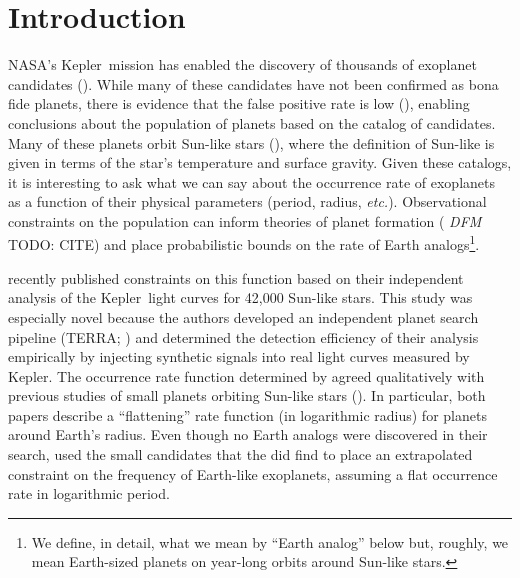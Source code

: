 \documentclass[12pt,preprint]{aastex}
\newcommand{\project}[1]{{\sffamily #1}}
\newcommand{\kepler}{\project{Kepler}}
\newcommand{\terra}{\project{TERRA}}
\newcommand{\foreign}[1]{\emph{#1}}
\newcommand{\etc}{\foreign{etc.}}
\newcommand{\todo}[3]{{\color{#2} \emph{#1} TODO: #3}}
\newcommand{\dfmtodo}[1]{\todo{DFM}{red}{#1}}
\begin{document}

\section{Introduction}

NASA's \kepler\ mission has enabled the discovery of thousands of exoplanet
candidates (\citealt{kepler-catalog}).
While many of these candidates have not been confirmed as bona fide planets,
there is evidence that the false positive rate is low (\citealt{morton,
fressin-fp}), enabling conclusions about the population of planets based on
the catalog of candidates.
Many of these planets orbit Sun-like stars (\citealt{petigura}), where the
definition of Sun-like is given in terms of the star's temperature and surface
gravity.
Given these catalogs, it is interesting to ask what we can say about the
occurrence rate of exoplanets as a function of their physical parameters
(period, radius, \etc).
Observational constraints on the population can inform theories
of planet formation (\dfmtodo{CITE}) and place probabilistic bounds on the
rate of Earth analogs\footnote{We define, in detail, what we mean by ``Earth
analog'' below but, roughly, we mean Earth-sized planets on year-long orbits
around Sun-like stars.}.

\citet{petigura} recently published constraints on this function based on
their independent analysis of the \kepler\ light curves for 42,000 Sun-like
stars.
This study was especially novel because the authors developed an independent
planet search pipeline (\terra; \citealt{petigura-a}) and determined the
detection efficiency of their analysis empirically by injecting synthetic
signals into real light curves measured by \kepler.
The occurrence rate function determined by \citet{petigura} agreed
qualitatively with previous studies of small planets orbiting Sun-like stars
(\citealt{dong}).
In particular, both papers describe a ``flattening'' rate function (in
logarithmic radius) for planets around Earth's radius.
Even though no Earth analogs were discovered in their search, \citet{petigura}
used the small candidates that the did find to place an extrapolated
constraint on the frequency of Earth-like exoplanets, assuming a flat
occurrence rate in logarithmic period.
\end{document}
